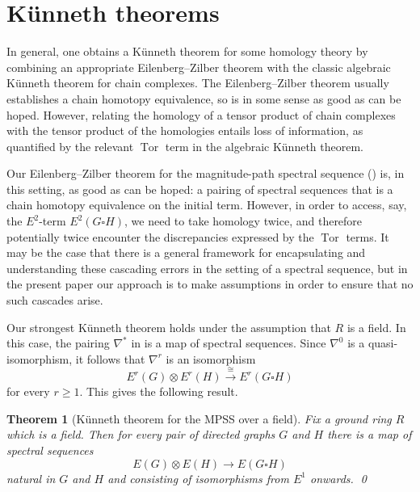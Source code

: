 \documentclass[a4paper, 11 pt, oneside, reqno]{amsart}
\numberwithin{lemma}{section}
\newtheorem{theorem}[lemma]{Theorem}
\theoremstyle{definition}
\newcommand{\xto}{\xrightarrow}
\DeclareMathOperator{\tor}{Tor}
\newcommand{\MPSS}{E}
\begin{document}

\section{K\"unneth theorems}\label{sec:kunneth}

In general, one obtains a K\"unneth theorem
for some homology theory by combining an appropriate 
Eilenberg--Zilber theorem with the classic algebraic
K\"unneth theorem for chain complexes.
The Eilenberg--Zilber theorem usually establishes a chain homotopy
equivalence, so is in some sense as good as can be hoped.
However, relating the homology of a tensor product of chain complexes with the
tensor product of the homologies entails loss of information, as quantified by the 
relevant $\tor$ term in the algebraic K\"unneth theorem.

Our Eilenberg--Zilber theorem for the magnitude-path spectral sequence () is, in this setting, as good as can be hoped:
a pairing of spectral sequences that is a chain homotopy equivalence on the initial
term.
However, in order to access, say, the $E^2$-term $E^2(G\square H)$, 
we need to take homology twice,
and therefore potentially twice encounter the discrepancies 
expressed by the $\tor$ terms.
It may be the case that there is a general framework for encapsulating
and understanding these cascading errors in the setting of a 
spectral sequence, but in the present paper our approach
is to make assumptions in order to ensure that no such cascades arise.

Our strongest K\"unneth theorem holds under the assumption that $R$ is a field.
In this case, the pairing \(\nabla^\ast\) 
in  is a map of spectral sequences. Since \(\nabla^0\) is a quasi-isomorphism, it follows that \(\nabla^r\) is an isomorphism
\[\MPSS^r(G) \otimes \MPSS^r(H) \xto{\cong} \MPSS^r(G \square H)\]
for every \(r \geq 1\). This gives the following result.

\begin{theorem}[K\"unneth theorem for the MPSS over a field]
\label{thm:kunneth_MPSS_field}
Fix a ground ring \(R\) which is a field. Then for every pair of directed graphs \(G\) and \(H\) there is a map of spectral sequences
\begin{equation*}
\MPSS(G) \otimes \MPSS(H) \to \MPSS(G \square H)
\end{equation*}
natural in \(G\) and \(H\) and consisting of isomorphisms from \(\MPSS^1\) onwards. \qed
\end{theorem}
\end{document}
